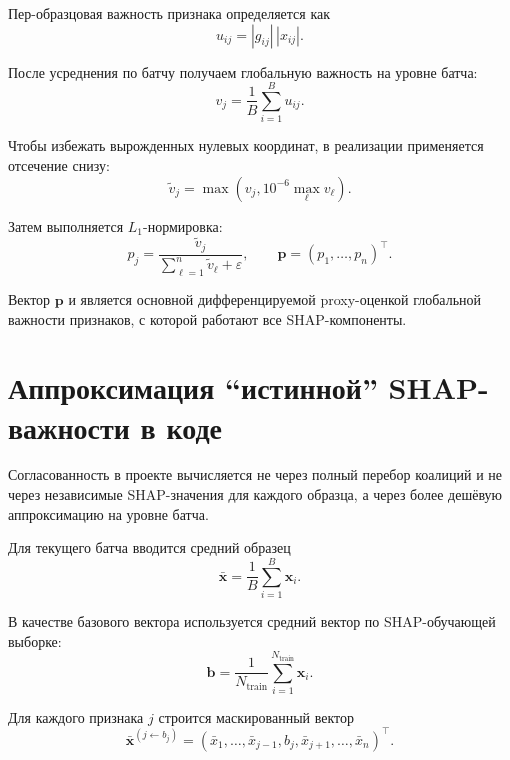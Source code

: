 \documentclass[11pt]{article}
\begin{document}
Пер-образцовая важность признака определяется как
\begin{equation}
 u_{ij} = |g_{ij}| \, |x_{ij}|.
\end{equation}

После усреднения по батчу получаем глобальную важность на уровне батча:
\begin{equation}
 v_j = \frac{1}{B} \sum_{i=1}^{B} u_{ij}.
\end{equation}

Чтобы избежать вырожденных нулевых координат, в реализации применяется отсечение снизу:
\begin{equation}
 \tilde{v}_j = \max\!\left(v_j, 10^{-6} \max_{\ell} v_{\ell}\right).
\end{equation}

Затем выполняется $L_1$-нормировка:
\begin{equation}
 p_j = \frac{\tilde{v}_j}{\sum_{\ell=1}^{n} \tilde{v}_{\ell} + \varepsilon},
 \qquad
 \mathbf{p} = (p_1,\dots,p_n)^\top.
\end{equation}

Вектор $\mathbf{p}$ и является основной дифференцируемой proxy-оценкой глобальной важности признаков, с которой работают все SHAP-компоненты.

\section{Аппроксимация ``истинной'' SHAP-важности в коде}

Согласованность в проекте вычисляется не через полный перебор коалиций и не через независимые SHAP-значения для каждого образца, а через более дешёвую аппроксимацию на уровне батча.

Для текущего батча вводится средний образец
\begin{equation}
\bar{\mathbf{x}} = \frac{1}{B} \sum_{i=1}^{B} \mathbf{x}_i.
\end{equation}

В качестве базового вектора используется средний вектор по SHAP-обучающей выборке:
\begin{equation}
\mathbf{b} = \frac{1}{N_{\mathrm{train}}} \sum_{i=1}^{N_{\mathrm{train}}} \mathbf{x}_i.
\end{equation}

Для каждого признака $j$ строится маскированный вектор
\begin{equation}
\bar{\mathbf{x}}^{(j \leftarrow b_j)} = (\bar{x}_1,\dots,\bar{x}_{j-1}, b_j, \bar{x}_{j+1},\dots,\bar{x}_n)^\top.
\end{equation}
\end{document}
